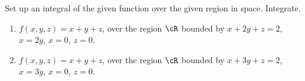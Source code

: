 Set up an integral of the given function over the given region in space. Integrate.
\begin{enumerate}
\item $f(x,y,z)=x+y+z$, over the region $\cR$ bounded by $ x + 2y+z=2$, $x=2y$, $x=0$, $z=0$.
\item \label{problemIntegratex+y+zoverx+3y+z=2,x=0,z=0,x=3y} $f(x,y,z)=x+y+z$, over the region $\cR$ bounded by $ x + 3y+z=2$, $x=3y$, $x=0$, $z=0$.
\end{enumerate}

